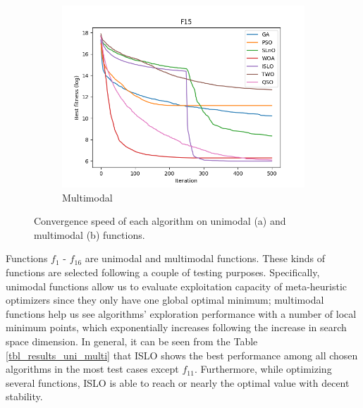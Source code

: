 \documentclass[a4paper,13pt,2p]{report}
\begin{document}
\begin{figure}[!ht]
\begin{subfigure}{0.49\textwidth}
  	 \includegraphics[width=1\linewidth]{png/convergence/islo_multi_F15}
  	 \caption{Multimodal}
  	\label{subfig:multi_convergence}
  	\end{subfigure}
  \caption{Convergence speed of each algorithm on unimodal (a) and multimodal (b) functions.} 
  \label{fig_uni_multi_convergence} 
\end{figure}
	Functions $f_1$ - $f_{16}$ are unimodal and multimodal functions. These kinds of functions are selected following a couple of testing purposes. Specifically, unimodal functions allow us to evaluate exploitation capacity of meta-heuristic optimizers since they only have one global optimal minimum; multimodal functions help us see algorithms' exploration performance with a number of local minimum points, which exponentially increases following the increase in search space dimension. In general, it can be seen from the Table \ref{tbl_results_uni_multi} that ISLO shows the best performance among all chosen algorithms in the most test cases except $f_{11}$. Furthermore, while optimizing several functions, ISLO is able to reach or nearly the optimal value with decent stability.
	 
\end{document}
